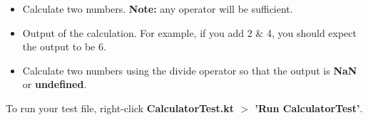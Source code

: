 \documentclass{article}
\begin{document}
\begin{itemize}
	\item Calculate two numbers. \textbf{Note:} any operator will be sufficient.
	\item Output of the calculation. For example, if you add 2 \& 4, you should expect the output to be 6.
	\item Calculate two numbers using the divide operator so that the output is \textbf{NaN} or \textbf{undefined}.
\end{itemize}

To run your test file, right-click \textbf{CalculatorTest.kt $>$ 'Run CalculatorTest'}.
\end{document}
